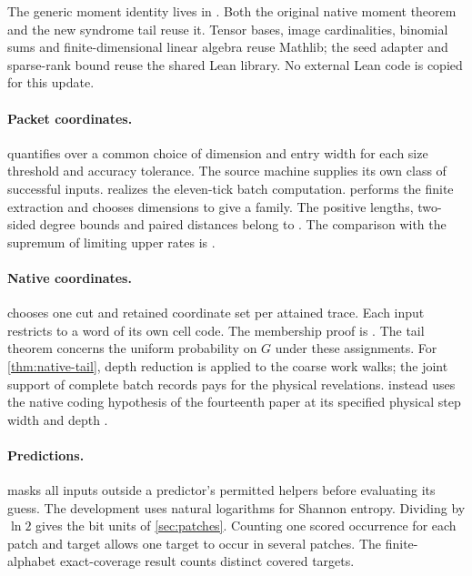 The generic moment identity lives in
. Both the original
native moment theorem and the new syndrome tail reuse it. Tensor
bases, image cardinalities, binomial sums and finite-dimensional
linear algebra reuse Mathlib; the seed adapter and sparse-rank bound
reuse the shared Lean library. No external Lean code is copied for
this update.

\paragraph{Packet coordinates.}
 quantifies over a common
choice of dimension and entry width for each size threshold and accuracy
tolerance. The source machine supplies its own class of successful inputs.
 realizes the eleven-tick
batch computation. 
performs the finite extraction and
 chooses
dimensions to give a family. The positive lengths, two-sided degree
bounds and paired distances belong to
. The comparison with the
supremum of limiting upper rates is
.

\paragraph{Native coordinates.}
 chooses one cut and
retained coordinate set per attained trace. Each input restricts to a
word of its own cell code. The membership proof is
. The tail theorem concerns the uniform
probability on $G$ under these assignments. For \cref{thm:native-tail},
depth reduction is applied to the coarse work walks; the joint support
of complete batch records pays for the physical revelations.
 instead uses the native coding hypothesis of the
fourteenth paper at its specified physical step width and depth
\cite[Corollary~L]{PaperFourteen}.

\paragraph{Predictions.}
 masks all inputs outside
a predictor's permitted helpers before evaluating its guess.
The development uses natural logarithms for Shannon entropy. Dividing
by $\ln 2$ gives the bit units of \cref{sec:patches}. Counting one scored
occurrence for each patch and target allows one target to occur in
several patches. The finite-alphabet exact-coverage result counts
distinct covered targets.

